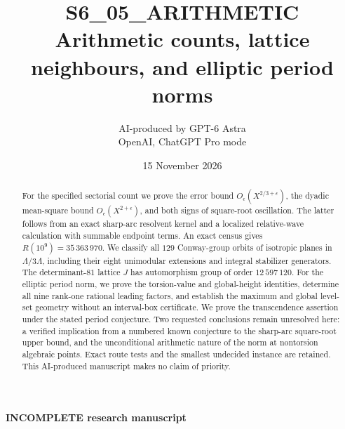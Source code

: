 \documentclass[11pt,a4paper]{article}
\title{S6\_05\_ARITHMETIC\\Arithmetic counts, lattice neighbours, and elliptic period norms}
\author{AI-produced by GPT-6 Astra\\OpenAI, ChatGPT Pro mode}
\date{15 November 2026}
\theoremstyle{definition}
\begin{document}
\maketitle
\begin{center}\textbf{INCOMPLETE research manuscript}\end{center}
\begin{abstract}
For the specified sectorial count we prove the error bound
$O_\epsilon(X^{2/3+\epsilon})$, the dyadic mean-square bound
$O_\epsilon(X^{2+\epsilon})$, and both signs of square-root
oscillation. The latter follows from an exact sharp-arc resolvent
kernel and a localized relative-wave calculation with summable
endpoint terms. An exact census gives $R(10^9)=35\,363\,970$.
We classify all $129$ Conway-group orbits of isotropic planes in
$\Lambda/3\Lambda$, including their eight unimodular extensions
and integral stabilizer generators. The determinant-$81$ lattice
$J$ has automorphism group of order $12\,597\,120$.
For the elliptic period norm, we prove the torsion-value and
global-height identities, determine all nine rank-one rational
leading factors, and establish the maximum and global level-set
geometry without an interval-box certificate. We prove the
transcendence assertion under the stated period conjecture.
Two requested conclusions remain unresolved here: a verified
implication from a numbered known conjecture to the sharp-arc
square-root upper bound, and the unconditional arithmetic nature
of the norm at nontorsion algebraic points. Exact route tests and
the smallest undecided instance are retained. This AI-produced
manuscript makes no claim of priority.
\end{abstract}
\tableofcontents
{}









\end{document}
